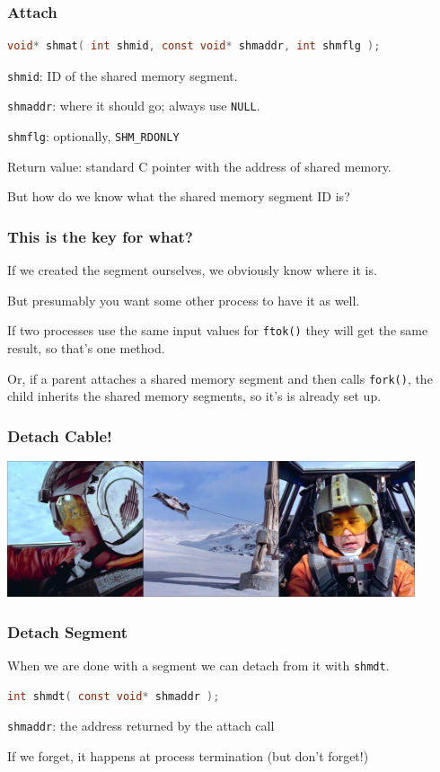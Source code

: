 \begin{frame}[fragile]
\frametitle{Attach}
\begin{lstlisting}[language=C]
void* shmat( int shmid, const void* shmaddr, int shmflg );
\end{lstlisting}

\texttt{shmid}: ID of the shared memory segment.

\texttt{shmaddr}: where it should go; always use \texttt{NULL}.

\texttt{shmflg}: optionally, \texttt{SHM\_RDONLY}

Return value: standard C pointer with the address of shared memory.

But how do we know what the shared memory segment ID is?

\end{frame}

\begin{frame}
\frametitle{This is the key for what?}

If we created the segment ourselves, we obviously know where it is. 

But presumably you want some other process to have it as well. 

If two processes use the same input values for \texttt{ftok()} they will get the same result, so that's one method. 

Or, if a parent attaches a shared memory segment and then calls \texttt{fork()}, the child inherits the shared memory segments, so it's is already set up.


\end{frame}


\begin{frame}
\frametitle{Detach Cable!}

\begin{center}
	\includegraphics[width=0.9\textwidth]{images/detach-cable.jpg}
\end{center}


\end{frame}

\begin{frame}[fragile]
\frametitle{Detach Segment}

When we are done with a segment we can detach from it with \texttt{shmdt}.

\begin{lstlisting}[language=C]
int shmdt( const void* shmaddr );
\end{lstlisting}

\texttt{shmaddr}: the address returned by the attach call

If we forget, it happens at process termination (but don't forget!)
\end{frame}

